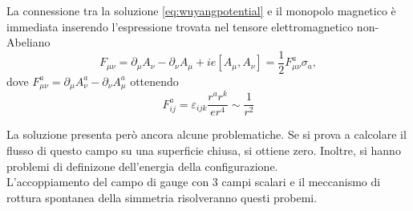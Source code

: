 La connessione tra la soluzione \ref{eq:wuyangpotential} e il monopolo magnetico
è immediata inserendo l'espressione trovata nel tensore elettromagnetico non-Abeliano
\begin{equation}
   F_{\mu\nu} = \partial _\mu A_\nu - \partial _\nu A _\mu + i e [A_\mu,A_\nu]
              = \frac{1}{2} F_{\mu\nu}^a \sigma _a ,
\end{equation}
dove $F_{\mu\nu}^a = \partial _\mu A_\nu^a - \partial _\nu A_\mu^a$
ottenendo
\begin{equation}
   F^a_{ij} = \varepsilon_{ijk} \frac{r^a r^k}{e r^4} \sim \frac{1}{r^2}
\end{equation}

La soluzione presenta però ancora alcune problematiche. Se si prova a calcolare
il flusso di questo campo su una superficie chiusa, si ottiene zero. Inoltre, si
hanno problemi di definizone dell'energia della configurazione.\\

L'accoppiamento del campo di gauge con 3 campi scalari e il meccanismo di
rottura spontanea della simmetria risolveranno questi probemi.
